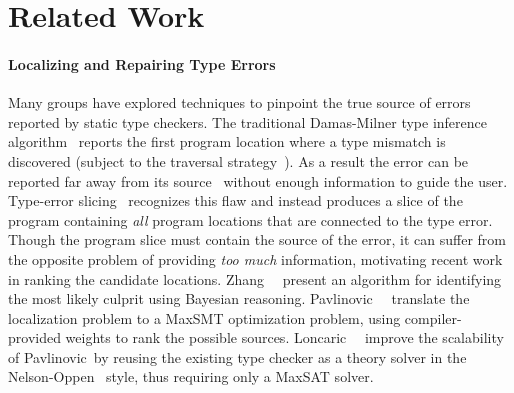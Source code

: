 \section{Related Work}
\label{sec:related-work}


\paragraph{Localizing and Repairing Type Errors}
\label{sec:diagnosis-repair}
%
Many groups have explored techniques to pinpoint the true source
of errors reported by static type checkers.
%
The traditional Damas-Milner type inference algorithm~\cite{Damas1982-uw}
reports the first program location where a type mismatch is discovered
(subject to the traversal strategy~\cite{Lee1998-ys}).
%
As a result the error can be reported far away from its
source~\cite{McAdam1998-ub} without enough information to guide the
user.
%
Type-error slicing~\cite{Haack2003-vc,Schilling2011-yf,Rahli2015-tt,Sagonas2013-bf,Gast2004-zd,Neubauer2003-xv}
recognizes this flaw and instead produces a slice of the program
containing \emph{all} program locations that are connected to the type
error.
%
%
Though the program slice must contain the source of the error, it can
suffer from the opposite problem of providing \emph{too much}
information, motivating recent work in ranking the candidate locations.
%
Zhang~\etal~\citealt{Zhang2014-lv,Zhang2015-yu} present an algorithm for
identifying the most likely culprit using Bayesian reasoning.
%
Pavlinovic~\etal~\citealt{Pavlinovic2014-mr,Pavlinovic2015-kh}
translate the %
localization problem to a MaxSMT optimization problem, using
compiler-provided weights to rank the possible sources.
%
Loncaric~\etal~\citealt{Loncaric2016-uk} improve the scalability of
Pavlinovic~\etal by reusing the existing type checker as
a theory solver in the Nelson-Oppen~\citealt{Nelson1979-td}
style, thus requiring only a MaxSAT solver.

